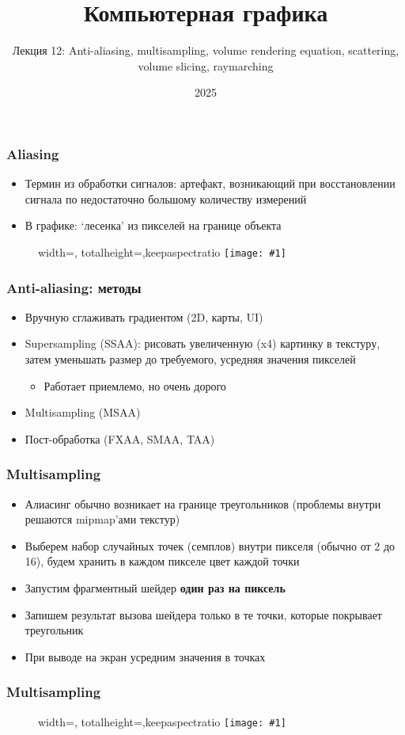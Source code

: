 \documentclass[10pt]{beamer}
\title{Компьютерная графика}
\subtitle{Лекция 12: Anti-aliasing, multisampling, volume rendering equation, scattering, volume slicing, raymarching}
\date{2025}
\newcommand{\slideimage}[1]{
  \begin{figure}
    \begin{adjustbox}{width=\textwidth, totalheight=\textheight-2\baselineskip-2\baselineskip,keepaspectratio}
      \texttt{[image: \#1]}
    \end{adjustbox}
  \end{figure}
}
\begin{document}

\frame{\titlepage}
\begin{frame}[fragile]
\frametitle{Aliasing}
\begin{itemize}
\item Термин из обработки сигналов: артефакт, возникающий при восстановлении сигнала по недостаточно большому количеству измерений
\pause
\item В графике: `лесенка' из пикселей на границе объекта
\end{itemize}
\slideimage{aliasing.png}
\end{frame}

\begin{frame}[fragile]
\frametitle{Anti-aliasing: методы}
\begin{itemize}
\item Вручную сглаживать градиентом (2D, карты, UI)
\pause
\item Supersampling (SSAA): рисовать увеличенную (x4) картинку в текстуру, затем уменьшать размер до требуемого, усредняя значения пикселей
\begin{itemize}
\item Работает приемлемо, но очень дорого
\end{itemize}
\pause
\item Multisampling (MSAA)
\pause
\item Пост-обработка (FXAA, SMAA, TAA)
\end{itemize}
\end{frame}

\begin{frame}[fragile]
\frametitle{Multisampling}
\begin{itemize}
\item Алиасинг обычно возникает на границе треугольников (проблемы внутри решаются mipmap'ами текстур)
\pause
\item Выберем набор случайных точек (семплов) внутри пикселя (обычно от 2 до 16), будем хранить в каждом пикселе цвет каждой точки
\pause
\item Запустим фрагментный шейдер \textbf{один раз на пиксель}
\pause
\item Запишем результат вызова шейдера только в те точки, которые покрывает треугольник
\pause
\item При выводе на экран усредним значения в точках
\end{itemize}
\end{frame}

\begin{frame}[fragile]
\frametitle{Multisampling}
\slideimage{multisampling.png}
\end{frame}
\end{document}
